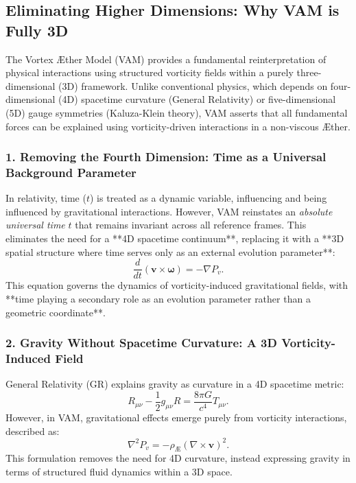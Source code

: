 \subsection{Eliminating Higher Dimensions: Why VAM is Fully 3D}\label{subsec:eliminating-higher-dimensions}

The Vortex Æther Model (VAM) provides a fundamental reinterpretation of physical interactions using structured vorticity fields within a purely three-dimensional (3D) framework. Unlike conventional physics, which depends on four-dimensional (4D) spacetime curvature (General Relativity) or five-dimensional (5D) gauge symmetries (Kaluza-Klein theory), VAM asserts that all fundamental forces can be explained using vorticity-driven interactions in a non-viscous Æther.

\subsubsection{1. Removing the Fourth Dimension: Time as a Universal Background Parameter}
In relativity, time (\( t \)) is treated as a dynamic variable, influencing and being influenced by gravitational interactions. However, VAM reinstates an \textit{absolute universal time} \( t \) that remains invariant across all reference frames. This eliminates the need for a **4D spacetime continuum**, replacing it with a **3D spatial structure where time serves only as an external evolution parameter**:
\begin{equation}
    \frac{d}{dt} (\mathbf{v} \times \boldsymbol{\omega}) = -\nabla P_v.
\end{equation}
This equation governs the dynamics of vorticity-induced gravitational fields, with **time playing a secondary role as an evolution parameter rather than a geometric coordinate**.

\subsubsection{2. Gravity Without Spacetime Curvature: A 3D Vorticity-Induced Field}
General Relativity (GR) explains gravity as curvature in a 4D spacetime metric:
\begin{equation}
    R_{\mu\nu} - \frac{1}{2} g_{\mu\nu} R = \frac{8\pi G}{c^4} T_{\mu\nu}.
\end{equation}
However, in VAM, gravitational effects emerge purely from vorticity interactions, described as:
\begin{equation}
    \nabla^2 P_v = -\rho_{\text{\AE}} (\nabla \times \mathbf{v})^2.
\end{equation}
This formulation removes the need for 4D curvature, instead expressing gravity in terms of structured fluid dynamics within a 3D space.

